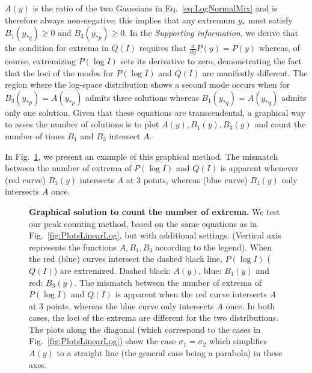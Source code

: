 \documentclass[11pt,a4paper,draft]{article}
\begin{document}
\smallskip
$A(y)$ is the ratio of the two Gaussians in Eq.~\ref{eq:LogNormalMix} and is therefore always non-negative; this implies that any extremum $y_*$ must satisfy $B_1(y_{*q})\ge 0$ and $B_3(y_{*p})\ge 0$. In the \emph{Supporting information}, we derive that the condition for extrema in $Q(I)$ requires that $\frac{d}{dy}P(y)=P(y)$ whereas, of course, extremizing $P(\log I)$ sets its derivative to zero, demonstrating the fact that the loci of the modes for $P(\log I)$ and $Q(I)$ are manifestly different. The region where the log-space distribution shows a second mode occurs when for $B_3(y_{*p})=A(y_{*p})$ admits three solutions whereas $B_1(y_{*q})=A(y_{*q})$ admits only one solution. Given that these equations are transcendental, a graphical way to asses the number of solutions is to plot $A(y),B_1(y),B_3(y)$ and count the number of times $B_1$ and $B_3$ intersect $A$.\smallskip

In Fig.~\ref{fig:ExtremaSolutions}, we present an example of this graphical method. The mismatch between the number of extrema of $P(\log I)$ and $Q(I)$ is apparent whenever (red curve) $B_3(y)$ intersects $A$ at 3 points, whereas (blue curve) $B_1(y)$ only intersects $A$ once. \smallskip

\begin{figure}[!ht]
 \centering
  \caption{\textbf{Graphical solution to count the number of extrema.} We test our peak counting method, based on the same equations as in Fig.~\ref{fig:PlotsLinearLog}, but with additional settings. (Vertical axis represents the functions $A, B_1,B_3$ according to the legend). When the red (blue) curves intersect the dashed black line, $P(\log I)$ ($Q(I)$) are extremized. Dashed black: $A(y)$, blue: $B_1(y)$ and red: $B_3(y)$. The mismatch between the number of extrema of $P(\log I)$ and $Q(I)$ is apparent when the red curve intersects $A$ at 3 points, whereas the blue curve only intersects $A$ once. In both cases, the loci of the extrema are different for the two distributions. The plots along the diagonal (which correspond to the cases in Fig.~\ref{fig:PlotsLinearLog}) show the case $\sigma_1=\sigma_2$ which simplifies $A(y)$ to a straight line (the general case being a parabola) in these axes.}
  \label{fig:ExtremaSolutions}
\end{figure}
\end{document}
